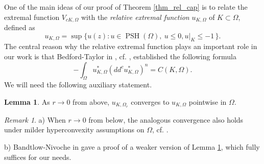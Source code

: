 \documentclass[12pt]{article}
\numberwithin{equation}{section}
\theoremstyle{theorem}
\theoremstyle{definition}
\newtheorem{lem}[thm]{Lemma}
\theoremstyle{remark}
\newtheorem{rem}[thm]{Remark}
\newcommand{\psh}{\operatorname{PSH}}
\begin{document}
	\par 
	One of the main ideas of our proof of Theorem \ref{thm_rel_cap} is to relate the extremal function $V_{c K, \Omega}$ with the \textit{relative extremal function} $u_{K, \Omega}$ of $K \subset \Omega$, defined as
	\begin{equation}\label{eq_defn_rel_extr}
		u_{K, \Omega}
		=
		\sup\big\{ u(z) : u \in \psh(\Omega),\ u \leq 0, u|_K \leq -1 \,\big\}.
	\end{equation}
	The central reason why the relative extremal function plays an important role in our work is that Bedford-Taylor in \cite{BedfordTaylor}, cf. \cite[Proposition 4.6.1]{KlimekBook}, established the following formula
	\begin{equation}\label{eq_rho_int2}
		- \int_{\Omega}  u_{K, \Omega}^* (dd^c u_{K, \Omega}^*)^{n}
		=
		C(K, \Omega).
	\end{equation}
	We will need the following auxiliary statement.
	\begin{lem}\label{eq_rel_extr_f}
		As $r \to 0$ from above, $u_{K, \Omega_r}$ converges to $u_{K, \Omega}$ pointwise in $\Omega$.
	\end{lem}
	\begin{rem}
		a) When $r \to 0$ from below, the analogous convergence also holds under milder hyperconvexity assumptions on $\Omega$, cf. \cite[Proposition 4.5.7]{KlimekBook}.
		\par 
		b) Bandtlow-Nivoche in \cite[Lemma 2.15]{BandNivoc} gave a proof of a weaker version of Lemma \ref{eq_rel_extr_f}, which fully suffices for our needs.
	\end{rem}
\end{document}
